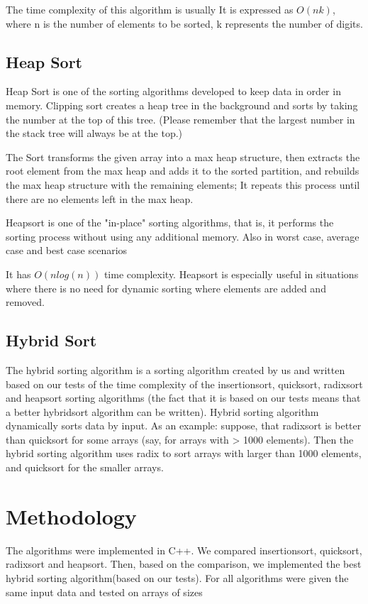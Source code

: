 \documentclass{article}
\begin{document}
The time complexity of this algorithm is usually
It is expressed as $O(nk)$, where
n is the number of elements to be sorted,
k represents the number of digits.

\subsection{Heap Sort}
Heap Sort is one of the sorting algorithms developed to keep data in order in memory. Clipping sort creates a heap tree in the background and sorts by taking the number at the top of this tree. (Please remember that the largest number in the stack tree will always be at the top.)

The Sort transforms the given array into a max heap structure, then extracts the root element from the max heap and adds it to the sorted partition, and rebuilds the max heap structure with the remaining elements; It repeats this process until there are no elements left in the max heap.


Heapsort is one of the "in-place" sorting algorithms, that is, it performs the sorting process without using any additional memory. Also in worst case, average case and best case scenarios

It has $O(nlog(n))$ time complexity. Heapsort is especially useful in situations where there is no need for dynamic sorting where elements are added and removed.

\subsection{Hybrid Sort}

The hybrid sorting algorithm is a sorting algorithm created by us and written based on our tests of the time complexity of the insertionsort, quicksort, radixsort and heapsort sorting algorithms (the fact that it is based on our tests means that a better hybridsort algorithm can be written). Hybrid sorting algorithm dynamically sorts data by input.  As an example: suppose, that radixsort is better than quicksort for some arrays (say, for arrays with > 1000 elements). Then the hybrid sorting algorithm uses radix to sort arrays with larger than 1000 elements, and quicksort for the smaller arrays. 


\maketitle
\section{Methodology}
The algorithms were implemented in C++. We compared insertionsort, quicksort, radixsort and heapsort. Then, based on the comparison, we implemented the best hybrid sorting algorithm(based on our tests).
For all algorithms were given the same input data and tested on arrays of sizes 
\end{document}
